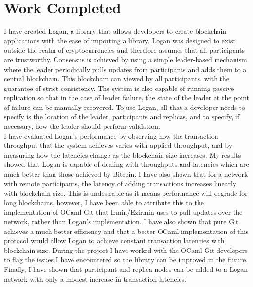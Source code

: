 \documentclass[12pt,a4paper,twoside,openright]{report}
\begin{document}
	\section{Work Completed}
	I have created Logan, a library that allows developers to create blockchain applications with the ease of importing a library.
	Logan was designed to exist outside the realm of cryptocurrencies and therefore assumes that all participants are trustworthy.
	Consensus is achieved by using a simple leader-based mechanism where the leader periodically pulls updates from participants and adds them to a central blockchain.
	This blockchain can viewed by all participants, with the guarantee of strict consistency.
	The system is also capable of running passive replication so that in the case of leader failure, the state of the leader at the point of failure can be manually recovered.
	To use Logan, all that a developer needs to specify is the location of the leader, participants and replicas, and to specify, if necessary, how the leader should perform validation.\\
	
	I have evaluated Logan's performance by observing how the transaction throughput that the system achieves varies with applied throughput, and by measuring how the latencies change as the blockchain size increases.
	My results showed that Logan is capable of dealing with throughputs and latencies which are much better than those achieved by Bitcoin.
	I have also shown that for a network with remote participants, the latency of adding transactions increases linearly with blockchain size. 
	This is undesirable as it means performance will degrade for long blockchains, however, I have been able to attribute this to the implementation of OCaml Git that Irmin/Ezirmin uses to pull updates over the network, rather than Logan's implementation. 
	I have also shown that pure Git achieves a much better efficiency and that a better OCaml implementation of this protocol would allow Logan to achieve constant transaction latencies with blockchain size.
	During the project I have worked with the OCaml Git developers to flag the issues I have encountered so the library can be improved in the future.
	Finally, I have shown that participant and replica nodes can be added to a Logan network with only a modest increase in transaction latencies.
\end{document}
